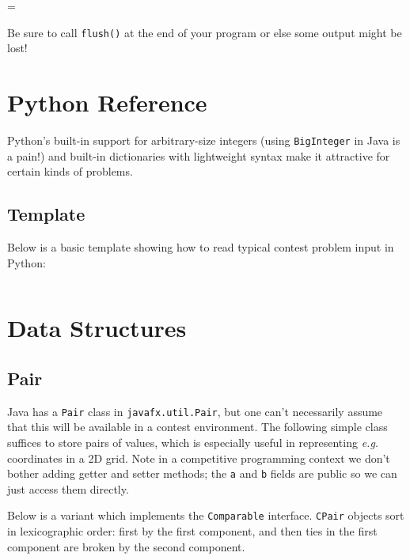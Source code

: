 \documentclass[10pt]{book}
\newcommand{\pycode}[1]{\inputminted[linenos=true,mathescape]{python}{code/#1}}
\newif\iftodos
\newcommand{\todo}[1]{\iftodos\textcolor{red}{[TODO: #1]}\fi}
\newenvironment{warning}
{\par\begin{mdframed}[linewidth=2pt,linecolor=red]%
    \begin{list}{}{\leftmargin=1cm
        \labelwidth=\leftmargin}\item[\Large\ding{43}]}
    {\end{list}\end{mdframed}\par}
\newcommand{\eg}{\emph{e.g.}\xspace}
\begin{document}
\begin{warning}
  Be sure to call \texttt{flush()} at the end of your program
  or else some output might be lost!
\end{warning}



\chapter{Python Reference} \label{chap:python}

Python's built-in support for arbitrary-size integers (using
\texttt{BigInteger} in Java is a pain!) and built-in dictionaries with
lightweight syntax make it attractive for certain kinds of problems.

\section{Template}

Below is a basic template showing how to read typical contest problem
input in Python:

\pycode{python/template.py}

\todo{Mention basic Python data structures such as set, deque, list methods}

\chapter{Data Structures}

\section{Pair}

Java has a \texttt{Pair} class in \texttt{javafx.util.Pair}, but one
can't necessarily assume that this will be available in a contest
environment.  The following simple class suffices to store pairs of
values, which is especially useful in representing \eg coordinates in
a 2D grid.  Note in a competitive programming context we don't bother
adding getter and setter methods; the \texttt{a} and
\texttt{b} fields are public so we can just access them directly.


Below is a variant which implements the \texttt{Comparable}
interface. \texttt{CPair} objects sort in lexicographic order: first
by the first component, and then ties in the first component are
broken by the second component.
\end{document}
